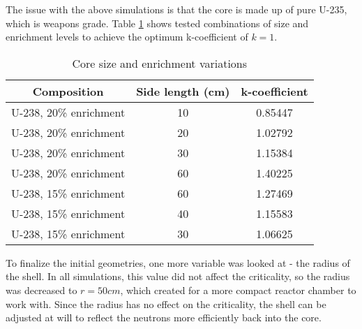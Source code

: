 The issue with the above simulations is that the core is made up of pure U-235, which is weapons grade. Table \ref{tab:variations} shows tested combinations of size and enrichment levels to achieve the optimum k-coefficient of $k=1$.
\begin{table}[!htbp]
\centering
\caption{Core size and enrichment variations}
\label{tab:variations}
\begin{tabular}{|c|c|c|}
\hline
Composition            & Side length (cm) & k-coefficient \\
\hline
U-238, 20\% enrichment & 10               & 0.85447       \\
\hline
U-238, 20\% enrichment & 20               & 1.02792       \\
\hline
U-238, 20\% enrichment & 30               & 1.15384       \\
\hline
U-238, 20\% enrichment & 60               & 1.40225       \\
\hline
U-238, 15\% enrichment & 60               & 1.27469       \\
\hline
U-238, 15\% enrichment & 40               & 1.15583       \\
\hline
U-238, 15\% enrichment & 30               & 1.06625      \\
\hline
\end{tabular}
\end{table}
To finalize the initial geometries, one more variable was looked at - the radius of the shell. In all simulations, this value did not affect the criticality, so the radius was decreased to $r=50cm$, which created for a more compact reactor chamber to work with. Since the radius has no effect on the criticality, the shell can be adjusted at will to reflect the neutrons more efficiently back into the core.